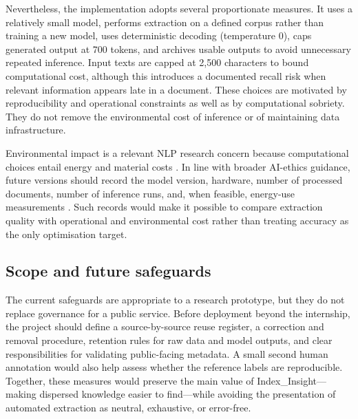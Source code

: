 Nevertheless, the implementation adopts several proportionate measures. It uses
a relatively small model, performs extraction on a defined corpus rather than
training a new model, uses deterministic decoding (temperature 0), caps generated
output at 700 tokens, and archives usable outputs to avoid unnecessary repeated
inference. Input texts are capped at 2,500 characters to bound computational
cost, although this introduces a documented recall risk when relevant information
appears late in a document. These choices are motivated by reproducibility and
operational constraints as well as by computational sobriety. They do not remove
the environmental cost of inference or of maintaining data infrastructure.

Environmental impact is a relevant NLP research concern because computational
choices entail energy and material costs \cite{strubell2019energy}. In line with
broader AI-ethics guidance, future versions should record the model version,
hardware, number of processed documents, number of inference runs, and, when
feasible, energy-use measurements \cite{unesco2021recommendation}. Such records
would make it possible to compare extraction quality with operational and
environmental cost rather than treating accuracy as the only optimisation target.

\subsection{Scope and future safeguards}

The current safeguards are appropriate to a research prototype, but they do not
replace governance for a public service. Before deployment beyond the internship,
the project should define a source-by-source reuse register, a correction and
removal procedure, retention rules for raw data and model outputs, and clear
responsibilities for validating public-facing metadata. A small second human
annotation would also help assess whether the reference labels are reproducible.
Together, these measures would preserve the main value of Index\_Insight---making
dispersed knowledge easier to find---while avoiding the presentation of automated
extraction as neutral, exhaustive, or error-free.

